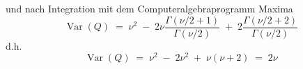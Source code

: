 und nach Integration mit dem Computeralgebraprogramm Maxima
\begin{equation}
\operatorname{Var}(Q) \; = \; \nu^2 \; - \;
2 \nu \frac{\Gamma(\nu/2 + 1)}{\Gamma(\nu/2)} \; + \;
2 \frac{\Gamma(\nu/2 + 2)}{\Gamma(\nu/2)}
\end{equation}
d.h.
\begin{equation}
\operatorname{Var}(Q) \; = \; \nu^2 \; - \; 2 \nu^2 \; + \; \nu (\nu+2) \; = \; 2 \nu
\end{equation}

\newpage
